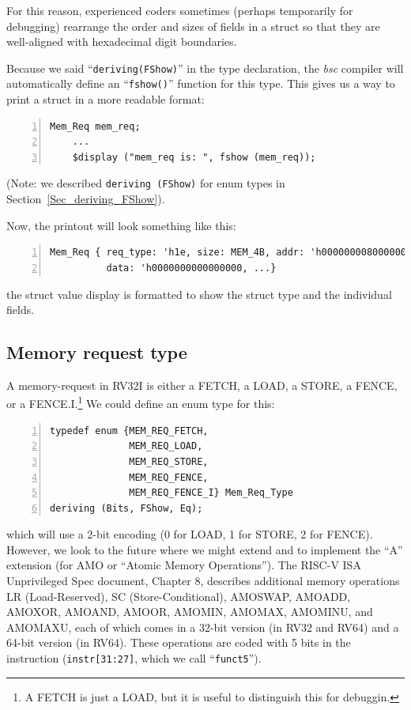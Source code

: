 For this reason, experienced {\BSV} coders sometimes (perhaps
temporarily for debugging) rearrange the order and sizes of fields in
a struct so that they are well-aligned with hexadecimal digit
boundaries.


Because we said ``\verb|deriving(FShow)|'' in the type declaration,
the \emph{bsc} compiler will automatically define an
``\verb|fshow()|'' function for this type.  This gives us a way to
print a struct in a more readable format:

{\footnotesize
\begin{Verbatim}[frame=single, numbers=left]
    Mem_Req mem_req;
    ...
    $display ("mem_req is: ", fshow (mem_req));
\end{Verbatim}
}

{\footnotesize
(Note: we described \verb|deriving (FShow)| for enum types in
Section~\ref{Sec_deriving_FShow}).}

Now, the printout will look something like this:

{\footnotesize
\begin{Verbatim}[frame=single, numbers=left]
Mem_Req { req_type: 'h1e, size: MEM_4B, addr: 'h0000000080000000,
          data: 'h0000000000000000, ...}
\end{Verbatim}
}

{\ie} the struct value display is formatted to show the struct type
and the individual fields.


\subsection{Memory request type}

\label{Sec_Mem_Req_Type}

A memory-request in RV32I is either a FETCH, a LOAD, a STORE, a FENCE,
or a FENCE.I.\footnote{A FETCH is just a LOAD, but it is useful to
distinguish this for debuggin.}  We could define an enum type for
this:

{\footnotesize
\begin{Verbatim}[frame=single, numbers=left]
typedef enum {MEM_REQ_FETCH,
              MEM_REQ_LOAD,
              MEM_REQ_STORE,
              MEM_REQ_FENCE,
              MEM_REQ_FENCE_I} Mem_Req_Type
deriving (Bits, FShow, Eq);
\end{Verbatim}
}

which will use a 2-bit encoding (0 for LOAD, 1 for STORE, 2 for
FENCE).  However, we look to the future where we might extend {\FIFE}
and {\DRUM} to implement the ``A'' extension (for AMO or ``Atomic
Memory Operations'').  The RISC-V ISA Unprivileged Spec document,
Chapter 8, describes additional memory operations LR (Load-Reserved),
SC (Store-Conditional), AMOSWAP, AMOADD, AMOXOR, AMOAND, AMOOR,
AMOMIN, AMOMAX, AMOMINU, and AMOMAXU, each of which comes in a 32-bit
version (in RV32 and RV64) and a 64-bit version (in RV64).  These
operations are coded with 5 bits in the instruction
(\verb|instr[31:27]|, which we call ``{\tt funct5}'').

